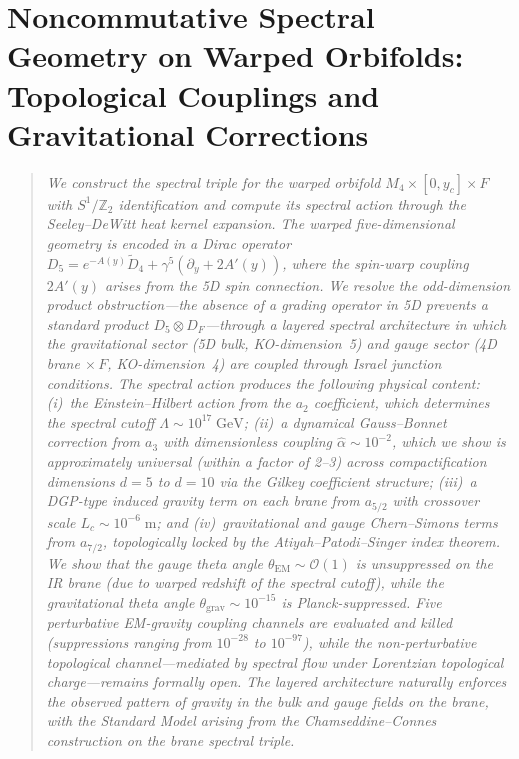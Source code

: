 
\chapter{Noncommutative Spectral Geometry on Warped Orbifolds: Topological Couplings and Gravitational Corrections}
\label{ch:ncg}

\begin{quote}\small\itshape
We construct the spectral triple for the warped orbifold $M_4 \times [0, y_c] \times F$ with $S^1/\mathbb{Z}_2$ identification and compute its spectral action through the Seeley--DeWitt heat kernel expansion. The warped five-dimensional geometry is encoded in a Dirac operator $D_5 = e^{-A(y)} \widetilde{D}_4 + \gamma^5(\partial_y + 2A'(y))$, where the spin-warp coupling $2A'(y)$ arises from the 5D spin connection. We resolve the odd-dimension product obstruction---the absence of a grading operator in 5D prevents a standard product $D_5 \otimes D_F$---through a layered spectral architecture in which the gravitational sector (5D bulk, KO-dimension~5) and gauge sector (4D brane $\times\, F$, KO-dimension~4) are coupled through Israel junction conditions. The spectral action produces the following physical content: (i)~the Einstein--Hilbert action from the $a_2$ coefficient, which determines the spectral cutoff $\Lambda \sim 10^{17}\;\mathrm{GeV}$; (ii)~a dynamical Gauss--Bonnet correction from $a_3$ with dimensionless coupling $\hat{\alpha} \sim 10^{-2}$, which we show is approximately universal (within a factor of 2--3) across compactification dimensions $d = 5$ to $d = 10$ via the Gilkey coefficient structure; (iii)~a DGP-type induced gravity term on each brane from $a_{5/2}$ with crossover scale $L_c \sim 10^{-6}\;\mathrm{m}$; and (iv)~gravitational and gauge Chern--Simons terms from $a_{7/2}$, topologically locked by the Atiyah--Patodi--Singer index theorem. We show that the gauge theta angle $\theta_{\mathrm{EM}} \sim \mathcal{O}(1)$ is unsuppressed on the IR brane (due to warped redshift of the spectral cutoff), while the gravitational theta angle $\theta_{\mathrm{grav}} \sim 10^{-15}$ is Planck-suppressed. Five perturbative EM-gravity coupling channels are evaluated and killed (suppressions ranging from $10^{-28}$ to $10^{-97}$), while the non-perturbative topological channel---mediated by spectral flow under Lorentzian topological charge---remains formally open. The layered architecture naturally enforces the observed pattern of gravity in the bulk and gauge fields on the brane, with the Standard Model arising from the Chamseddine--Connes construction on the brane spectral triple.
\end{quote}

